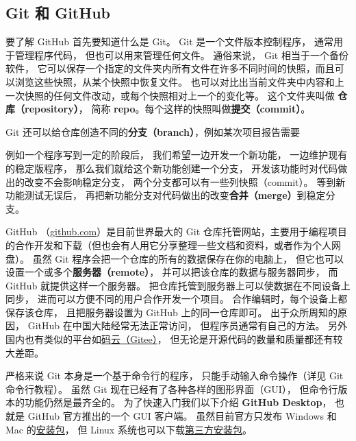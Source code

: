 

\subsection{Git 和 GitHub}
要了解 GitHub 首先要知道什么是 Git。 Git 是一个文件版本控制程序， 通常用于管理程序代码， 但也可以用来管理任何文件。 通俗来说， Git 相当于一个备份软件， 它可以保存一个指定的文件夹内所有文件在许多不同时间的快照，而且可以浏览这些快照，从某个快照中恢复文件。 也可以对比出当前文件夹中内容和上一次快照的任何文件改动，或每个快照相对上一个的变化等。 这个文件夹叫做 \textbf{仓库（repository）}， 简称 \textbf{repo}。每个这样的快照叫做\textbf{提交（commit）}。


Git 还可以给仓库创造不同的\textbf{分支（branch）}，例如某次项目报告需要

例如一个程序写到一定的阶段后， 我们希望一边开发一个新功能， 一边维护现有的稳定版程序， 那么我们就给这个新功能创建一个分支， 开发该功能时对代码做出的改变不会影响稳定分支， 两个分支都可以有一些列快照（commit）。 等到新功能测试无误后， 再把新功能分支对代码做出的改变\textbf{合并（merge）}到稳定分支。

GitHub （\href{https://github.com}{github.com}）是目前世界最大的 Git 仓库托管网站，主要用于编程项目的合作开发和下载（但也会有人用它分享整理一些文档和资料，或者作为个人网盘）。 虽然 Git 程序会把一个仓库的所有的数据保存在你的电脑上， 但它也可以设置一个或多个\textbf{服务器（remote）}， 并可以把该仓库的数据与服务器同步， 而 GitHub 就提供这样一个服务器。 把仓库托管到服务器上可以使数据在不同设备上同步， 进而可以方便不同的用户合作开发一个项目。 合作编辑时，每个设备上都保存该仓库， 且把服务器设置为 GitHub 上的同一仓库即可。 出于众所周知的原因， GitHub 在中国大陆经常无法正常访问， 但程序员通常有自己的方法。 另外国内也有类似的平台如\href{https://gitee.com/}{码云（Gitee）}， 但无论是开源代码的数量和质量都还有较大差距。

严格来说 Git 本身是一个基于命令行的程序， 只能手动输入命令操作（详见 Git 命令行教程）。 虽然 Git 现在已经有了各种各样的图形界面（GUI）， 但命令行版本的功能仍然是最齐全的。 为了快速入门我们以下介绍 \textbf{GitHub Desktop}， 也就是 GitHub 官方推出的一个 GUI 客户端。 虽然目前官方只发布 Windows 和 Mac 的\href{https://desktop.github.com/}{安装包}， 但 Linux 系统也可以下载\href{https://github.com/shiftkey/desktop/releases}{第三方安装包}。
 

